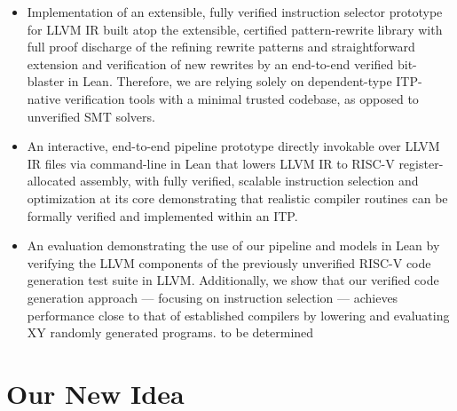 \documentclass[review, anonymous, acmsmall, screen]{acmart}
\begin{document}
\begin{itemize}

\item {Implementation of an extensible, fully verified instruction selector prototype for LLVM IR built
 atop the extensible, certified pattern-rewrite library with full proof discharge of the refining 
 rewrite patterns and straightforward extension and verification of new rewrites by an end-to-end verified 
 bit-blaster in Lean. Therefore, we are relying solely on dependent-type ITP-native verification tools
  with a minimal trusted codebase, as opposed to unverified SMT solvers.}




\item {An interactive, end-to-end pipeline prototype directly invokable over LLVM IR files via 
command-line in Lean that lowers  LLVM IR to RISC-V register-allocated assembly, with fully verified,
 scalable instruction selection and optimization at its core  demonstrating that realistic compiler 
 routines can be formally verified and implemented within an ITP.}

\item {An evaluation demonstrating the use of our pipeline and models in Lean by verifying the LLVM 
components of the previously unverified RISC-V code generation test suite in LLVM. Additionally, we 
show that our verified code generation approach — focusing on instruction selection — achieves performance 
close to that of established compilers by lowering and evaluating XY randomly generated programs. 
to be determined }
\end{itemize}

\section{Our New Idea}
\end{document}
